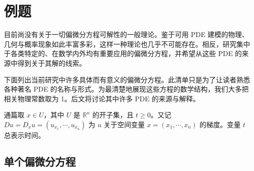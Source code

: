\documentclass[../../main.tex]{subfiles}
\begin{document}
\section{例题}\label{section:ch01-examples}

目前尚没有关于一切偏微分方程可解性的一般理论。鉴于可用 PDE 建模的物理、几何与概率现象如此丰富多彩，这样一种理论也几乎不可能存在。相反，研究集中于各类特定的、在数学内外均有重要应用的偏微分方程，并希望从这些 PDE 的来源中得到关于其解的线索。

下面列出当前研究中许多具体而有意义的偏微分方程。此清单只是为了让读者熟悉各种著名 PDE 的名称与形式。为最清楚地展现这些方程的数学结构，我们大多把相关物理常数取为 1。后文将讨论其中许多 PDE 的来源与解释。

通篇取 $x\in U$，其中 $U$ 是 $\mathbb{R}^n$ 的开子集，且 $t\geqslant 0$。又记 $Du=D_xu=(u_{x_1},\cdots,u_{x_n})$ 为 $u$ 关于空间变量 $x=(x_1,\cdots,x_n)$ 的梯度。变量 $t$ 总表示时间。

\subsection{单个偏微分方程}\label{subsection:ch01-single}
\end{document}
